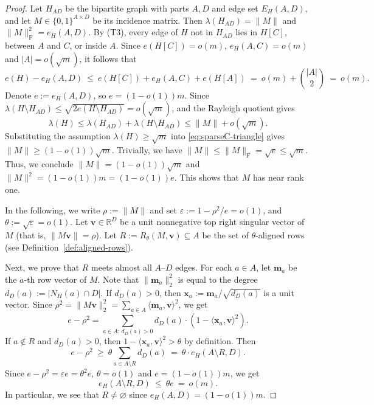 \documentclass[11pt]{article}
\theoremstyle{definition}
\theoremstyle{plain}
\begin{document}
\begin{proof} 
Let $H_{AD}$ be the bipartite graph with parts $A,D$ and edge set $E_H(A,D)$, and let
$M\in\{0,1\}^{A\times D}$ be its incidence matrix.
Then $\lambda(H_{AD})=\|M\|$ and $\|M\|_{\mathrm F}^2=e_H(A,D)$. 
By \textup{(T3)}, every edge of $H$ not in $H_{AD}$ lies in $H[C]$, between $A$ and $C$, or inside $A$.
Since $e(H[C])=o(m)$, $e_H(A,C)=o(m)$ and $|A| =o(\sqrt{m})$, it follows that 
\[
  e(H)-e_H(A,D)
  \ \le\
  e(H[C]) + e_H(A,C) + e(H[A])
  \ =\ o(m) + \binom{|A|}{2}
  \ =\ o(m).
\]
Denote $e:=e_H(A,D)$, so $e=(1-o(1))m$.
Since $\lambda(H\setminus H_{AD})\le \sqrt{2e(H\setminus H_{AD})}=o(\sqrt{m})$, and  the Rayleigh quotient gives 
\begin{equation}\label{eq:sparseC-triangle}
  \lambda(H) \le \lambda (H_{AD}) + \lambda (H\setminus H_{AD}) \le \|M\|+o(\sqrt{m}).
\end{equation} 
Substituting the assumption $\lambda(H)\ge \sqrt{m}$ into \eqref{eq:sparseC-triangle} gives 
$\|M\| \ge (1-o(1)) \sqrt{m}$. 
Trivially, we have $\|M\|\le \|M\|_{\mathrm F}=\sqrt e\le \sqrt{m}$. Thus, we conclude  $\|M\|=(1-o(1))\sqrt{m}$ and $ \|M\|^2 = (1-o(1)) m =(1-o(1))e$. This shows that $M$ has near rank one. 

In the following, we write $\rho:=\|M\|$ and set 
$\varepsilon:=1-\rho^2/e=o(1)$, and 
$ \theta:=\sqrt{\varepsilon} = o(1)$. 
Let $\bm{v} \in \mathbb{R}^D$ be a unit nonnegative top right singular vector of $M$ (that is, $\|M \bm{v}\| = \rho $). Let $R:=R_\theta(M, \bm{v})\subseteq A$
be the set of $\theta$-aligned rows  (see Definition~\ref{def:aligned-rows}).

Next, we prove that $R$ meets almost all $A$--$D$ edges. 
For each $a\in A$, let $\bm{m}_a$ be the $a$-th row vector of $M$. Note that $\|\bm{m}_a\|_2^2$ is equal to the degree $d_D(a):=|N_H(a)\cap D|$.
If $d_D(a)>0$, then $\bm{x}_a:=\bm{m}_a/\sqrt{d_D(a)}$ is a unit vector.
Since $\rho^2=\|M \bm{v} \|_2^2=\sum_{a\in A}\langle \bm{m}_a,\bm{v}\rangle^2$, we get 
\[
  e-\rho^2
  =
  \sum_{a\in A:\,d_D(a)>0} d_D (a) \cdot \left(1-\langle \bm{x}_a,\bm{v}\rangle^2\right).
\]
If $a\notin R$ and $d_D(a)>0$, then $1-\langle \bm{x}_a,\bm{v}\rangle^2>\theta$ by definition. Then 
\[
  e-\rho^2\ \ge\ \theta\sum_{a\in A\setminus R}d_D(a)\ =\ \theta \cdot e_H(A\setminus R,D).
\]
Since $e-\rho^2=\varepsilon e=\theta^2 e$, $\theta =o(1)$ and $e =(1-o(1))m$, 
we get
\begin{equation}\label{eq:sparseC-aligned-rowcover}
  e_H(A\setminus R,D)\ \le\ \theta e\ =\ o(m).
\end{equation}
In particular, we see that $R\neq\varnothing$ since $e_H(A,D)=(1-o(1))m$. 


\end{proof}
\end{document}
